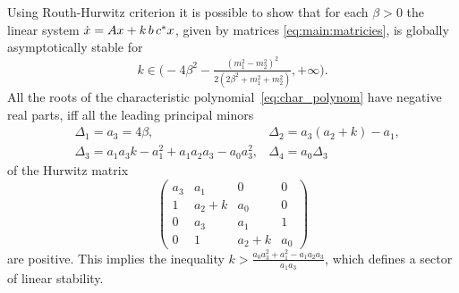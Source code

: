 \documentclass{ifacconf}
\theoremstyle{plain}
\begin{document}
Using Routh-Hurwitz criterion it is possible to show
that for each $\beta > 0$ the linear system $\dot{\rm x} = A {\rm x} + k \, b \, c^* {\rm x}$,
given by matrices \eqref{eq:main:matricies}, is globally asymptotically stable for
$$
  k \in \big(-4\beta^2 - \tfrac{(m_1^2 - m_2^2)^2}{2(2\beta^2 + m_1^2 + m_2^2)}, +\infty\big).
$$
All the roots of the characteristic polynomial~\eqref{eq:char_polynom} have negative real parts,
iff all the leading principal minors
\begin{equation*}
  \begin{aligned}
  &\Delta_1 = a_3 = 4\beta, & \Delta_2 = a_3(a_2+k) - a_1, \\
  &\Delta_3 = a_1a_3k - a_1^2 + a_1a_2a_3-a_0a_3^2, & \Delta_4 = a_0\Delta_3
  \end{aligned}
\end{equation*}
of the Hurwitz matrix
\begin{equation*}\label{eq:lin_matrix_hurwitz}
 \left(
  \begin{array}{cccc}
    a_3 & a_1 & 0 & 0 \\
    1 & a_2+k & a_0 & 0 \\
    0 & a_3 & a_1 & 1  \\
    0 & 1 & a_2 + k & a_0
  \end{array}
  \right)
\end{equation*}
are positive.
This implies the inequality $k > \frac{a_0a_3^2+a_1^2-a_1a_2a_3}{a_1a_3}$,
which defines a sector of linear stability.
\end{document}
